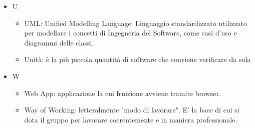 \documentclass[12pt]{article}
\begin{document}
\begin{itemize}
\begin{itemize}
    \end{itemize}
    \item[] U
    \begin{itemize}
        \item UML: Unified Modelling Language. Linguaggio standardizzato utilizzato per modellare i concetti di Ingegneria del Software, come casi d'uso e diagrammi delle classi.
        \item Unità: è la più piccola quantità di software che conviene verificare da sola
    \end{itemize}
    \item[] W
    \begin{itemize}
        \item Web App: applicazione la cui fruizione avviene tramite browser.
        \item Way of Working: letteralmente "modo di lavorare". E' la base di cui si dota il gruppo per lavorare coerentemente e in maniera professionale.
    \end{itemize}    
\end{itemize}
\end{document}
